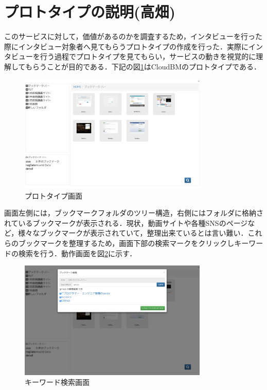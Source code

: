 \documentclass[a4paper,10pt,fleqn]{jsarticle}
\begin{document}
\section{プロトタイプの説明(高畑)}
このサービスに対して，価値があるのかを調査するため，インタビューを行った際にインタビュー対象者へ見てもらうプロトタイプの作成を行った．実際にインタビューを行う過程でプロトタイプを見てもらい，サービスの動きを視覚的に理解してもらうことが目的である．下記の図\ref{fig:prot1}はCloudBMのプロトタイプである．

\begin{figure}[h]
  \begin{center}
    \includegraphics[width=9.0cm]{./prot1.png}
    \caption{プロトタイプ画面}
    \label{fig:prot1}
  \end{center}
\end{figure}

画面左側には，ブックマークフォルダのツリー構造，右側にはフォルダに格納されているブックマークが表示される．現状，動画サイトや各種SNSのページなど，様々なブックマークが表示されていて，整理出来ているとは言い難い．これらのブックマークを整理するため，画面下部の検索マークをクリックしキーワードの検索を行う．動作画面を図\ref{fig:prot2}に示す．

\begin{figure}[h]
  \begin{center}
    \includegraphics[width=9.0cm]{./prot2.png}
    \caption{キーワード検索画面}
    \label{fig:prot2}
  \end{center}
\end{figure}
\end{document}
